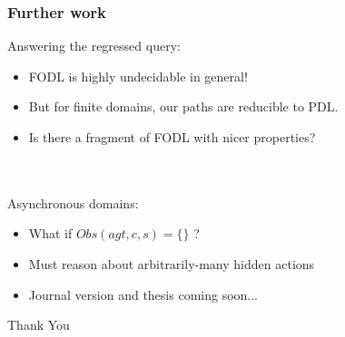 \documentclass[compress]{beamer}
\begin{document}
\begin{frame}
\frametitle{Further work}
Answering the regressed query:
\begin{itemize}
\item FODL is highly undecidable in general!
\item But for finite domains, our paths are reducible to PDL.
\item Is there a fragment of FODL with nicer properties?
\end{itemize}
\ \\
\ \\
Asynchronous domains:
\begin{itemize}
\item What if $Obs(agt,c,s) = \{\}$ ?
\item Must reason about arbitrarily-many hidden actions
\pause
\item Journal version and thesis coming soon...
\end{itemize}
\end{frame}

\begin{frame}
\centering \large Thank You\\
\end{frame}
\end{document}
